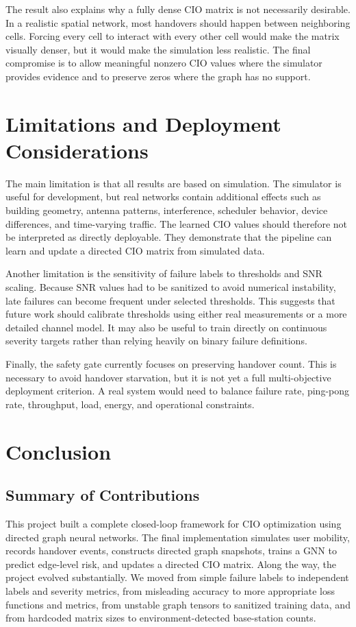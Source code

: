 \documentclass[11pt,a4paper]{article}
\begin{document}
The result also explains why a fully dense CIO matrix is not necessarily desirable. In a realistic spatial network, most handovers should happen between neighboring cells. Forcing every cell to interact with every other cell would make the matrix visually denser, but it would make the simulation less realistic. The final compromise is to allow meaningful nonzero CIO values where the simulator provides evidence and to preserve zeros where the graph has no support.

\section{Limitations and Deployment Considerations}
\label{sec:limitations}
The main limitation is that all results are based on simulation. The simulator is useful for development, but real networks contain additional effects such as building geometry, antenna patterns, interference, scheduler behavior, device differences, and time-varying traffic. The learned CIO values should therefore not be interpreted as directly deployable. They demonstrate that the pipeline can learn and update a directed CIO matrix from simulated data.

Another limitation is the sensitivity of failure labels to thresholds and SNR scaling. Because SNR values had to be sanitized to avoid numerical instability, late failures can become frequent under selected thresholds. This suggests that future work should calibrate thresholds using either real measurements or a more detailed channel model. It may also be useful to train directly on continuous severity targets rather than relying heavily on binary failure definitions.

Finally, the safety gate currently focuses on preserving handover count. This is necessary to avoid handover starvation, but it is not yet a full multi-objective deployment criterion. A real system would need to balance failure rate, ping-pong rate, throughput, load, energy, and operational constraints.

\section{Conclusion}
\label{sec:conclusion}

\subsection{Summary of Contributions}
This project built a complete closed-loop framework for CIO optimization using directed graph neural networks. The final implementation simulates user mobility, records handover events, constructs directed graph snapshots, trains a GNN to predict edge-level risk, and updates a directed CIO matrix. Along the way, the project evolved substantially. We moved from simple failure labels to independent labels and severity metrics, from misleading accuracy to more appropriate loss functions and metrics, from unstable graph tensors to sanitized training data, and from hardcoded matrix sizes to environment-detected base-station counts.
\end{document}

